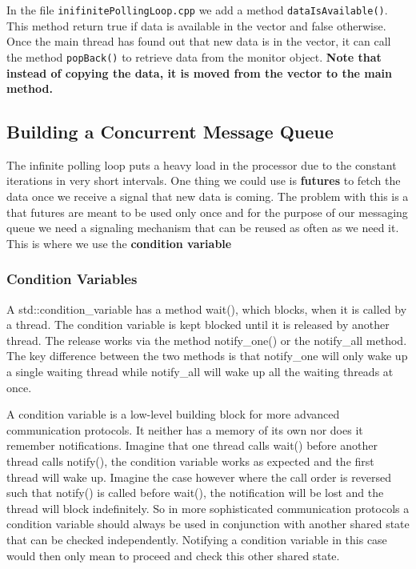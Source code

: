 \documentclass[11pt, a4paper]{article}
\begin{document}
In the file \texttt{inifinitePollingLoop.cpp} we add a method \texttt{dataIsAvailable()}. This method return true if data is available in the vector and false otherwise. Once the main thread has found out that new data is in the vector, it can call the method \texttt{popBack()} to retrieve data from the monitor object. \textbf{Note that instead of copying the data, it is moved from the vector to the main method.}


\subsection{Building a Concurrent Message Queue}%
\label{sub:building_a_concurrent_message_queue}

The infinite polling loop puts a heavy load in the processor due to the constant iterations in very short intervals. One thing we could use is \textbf{futures} to fetch the data once we receive a signal that new data is coming. The problem with this is a that futures are meant to be used only once and for the purpose of our messaging queue we need a signaling mechanism that can be reused as often as we need it. This is where we use the \textbf{condition variable}


\subsubsection{Condition Variables}%
\label{ssub:condition_variables}

A std::condition\_variable has a method wait(), which blocks, when it is called by a thread. The condition variable is kept blocked until it is released by another thread. The release works via the method notify\_one() or the notify\_all method. The key difference between the two methods is that notify\_one will only wake up a single waiting thread while notify\_all will wake up all the waiting threads at once.

A condition variable is a low-level building block for more advanced communication protocols. It neither has a memory of its own nor does it remember notifications. Imagine that one thread calls wait() before another thread calls notify(), the condition variable works as expected and the first thread will wake up. Imagine the case however where the call order is reversed such that notify() is called before wait(), the notification will be lost and the thread will block indefinitely. So in more sophisticated communication protocols a condition variable should always be used in conjunction with another shared state that can be checked independently. Notifying a condition variable in this case would then only mean to proceed and check this other shared state.
\end{document}
